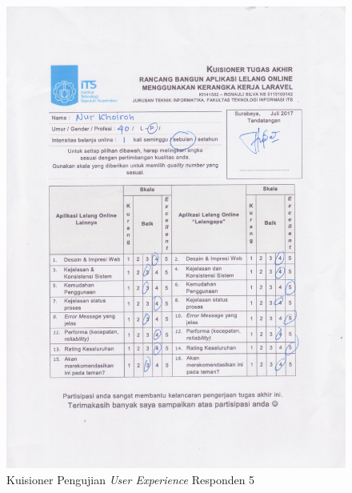 \begin{figure}[H]
	\centering
	\includegraphics[width=.9\textwidth]{images/bab5/ujipengguna/5.jpg}
	\caption{Kuisioner Pengujian \textit{User Experience} Responden 5}
	\label{quest-5}
\end{figure}
